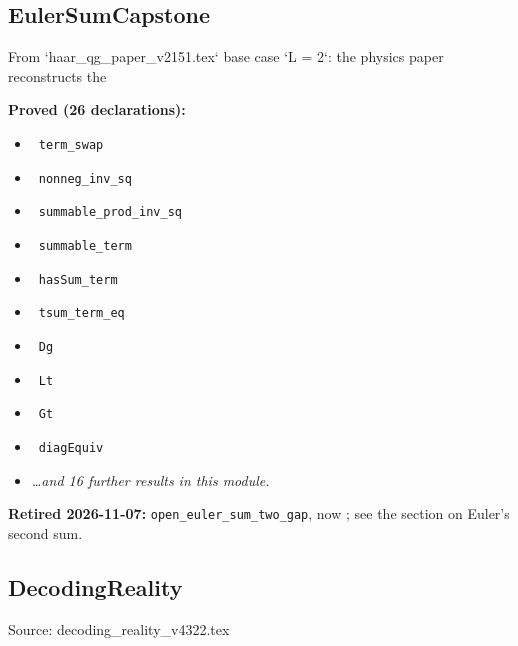 \documentclass{report}
\theoremstyle{definition}
\begin{document}
\begin{itemize}
\begin{itemize}
\subsection{EulerSumCapstone}
From `haar\_qg\_paper\_v2151.tex` base case `L = 2`: the physics paper reconstructs the

\noindent\textbf{Proved (26 declarations):}
\begin{itemize}
  \item {}\leanok\ \texttt{term\_swap}
  \item {}\leanok\ \texttt{nonneg\_inv\_sq}
  \item {}\leanok\ \texttt{summable\_prod\_inv\_sq}
  \item {}\leanok\ \texttt{summable\_term}
  \item {}\leanok\ \texttt{hasSum\_term}
  \item {}\leanok\ \texttt{tsum\_term\_eq}
  \item {}\leanok\ \texttt{Dg}
  \item {}\leanok\ \texttt{Lt}
  \item {}\leanok\ \texttt{Gt}
  \item {}\leanok\ \texttt{diagEquiv}
  \item \emph{\ldots and 16 further results in this module.}
\end{itemize}
\noindent\textbf{Retired 2026-11-07:} \texttt{open\_euler\_sum\_two\_gap}, now \leanok; see the section on Euler's second sum.

\subsection{DecodingReality}
Source: decoding\_reality\_v4322.tex


\end{itemize}
\end{itemize}
\end{document}

